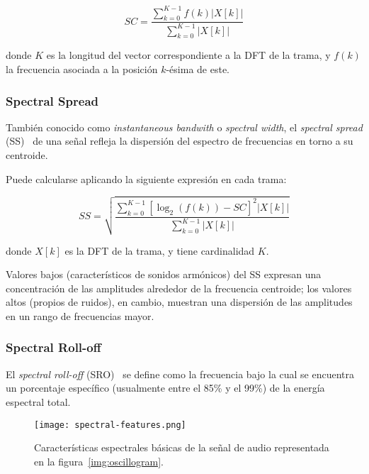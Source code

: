 \begin{equation}
    \label{eq:SC}
    SC = \frac{\sum_{k=0}^{K-1}{f(k)|X[k]|}}{\sum_{k=0}^{K-1}{|X[k]|}}
\end{equation}

\noindent
donde $K$ es la longitud del vector correspondiente a la DFT de la trama, y $f(k)$ la frecuencia asociada a la posición $k$-ésima de este.

\subsubsection{Spectral Spread}

También conocido como \textit{instantaneous bandwith} o \textit{spectral width}, el \textit{spectral spread} (SS)~\cite{Fagerlund07,Kim05,Manjunath02,Peters04} de una señal refleja la dispersión del espectro de frecuencias en torno a su centroide.

Puede calcularse aplicando la siguiente expresión en cada trama:

\begin{equation}
    \label{eq:SS}
    SS = \sqrt{\frac{\sum_{k=0}^{K-1}{\left[ \log_{2}{(f(k))-SC} \right]^2 |X[k]|}}{\sum_{k=0}^{K-1}{|X[k]|}}}
\end{equation}

\noindent
donde $X[k]$ es la DFT de la trama, y tiene cardinalidad $K$.

Valores bajos (característicos de sonidos armónicos) del SS expresan una concentración de las amplitudes alrededor de la frecuencia centroide;
los valores altos (propios de ruidos), en cambio, muestran una dispersión de las amplitudes en un rango de frecuencias mayor.

\subsubsection{Spectral Roll-off}\label{subsubsec:spectrallRollOff}

El \textit{spectral roll-off} (SRO)~\cite{Fagerlund07,Peters04} se define como la frecuencia bajo la cual se encuentra un porcentaje específico (usualmente entre el 85\% y el 99\%) de la energía espectral total.

\begin{figure}[!h]
    \centering
    \texttt{[image: spectral-features.png]}
    \caption{Características espectrales básicas de la señal de audio representada en la figura~\ref{img:oscillogram}.}
    \label{img:basic-spectral-descriptors}
\end{figure}

